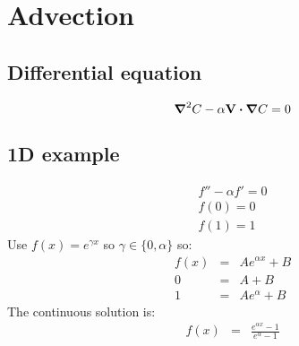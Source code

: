\section{Advection}
\subsection{Differential equation}
\begin{equation}
	\boldsymbol{\nabla}^2 C - \alpha \mathbf{V} \boldsymbol{\cdot} \boldsymbol{\nabla} C = 0	
\end{equation}

\subsection{1D example}
\begin{eqnarray}
  f'' - \alpha f' = 0 \\
  f(0) = 0 \\ f(1) = 1
\end{eqnarray}
Use $f(x) = e^{\gamma x}$ so $\gamma \in \{0, \alpha\}$ so:
\begin{eqnarray}
  f(x) &=& Ae^{\alpha x} + B \\
  0 &=& A + B \\
  1 &=& Ae^{\alpha} + B
\end{eqnarray}
The continuous solution is:
\begin{eqnarray}
  f(x) &=& \frac{e^{\alpha x} - 1}{e^{\alpha} - 1}
\end{eqnarray}

